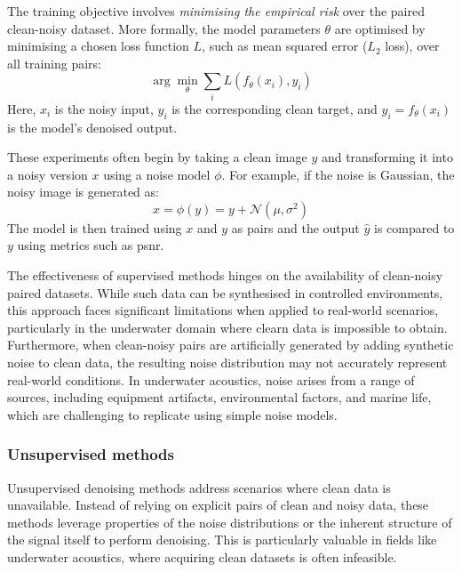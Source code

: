 The training objective involves \textit{minimising the empirical risk} over the paired clean-noisy dataset. More formally, the model parameters $\theta$ are optimised by minimising a chosen loss function $L$, such as mean squared error ($L_2$ loss), over all training pairs:
\begin{equation}
    \arg \min_\theta \sum_i L(f_\theta (x_i), y_i)
\end{equation}
Here, $x_i$ is the noisy input, $y_i$ is the corresponding clean target, and $\hat{y}_i = f_\theta(x_i)$ is the model's denoised output.

These experiments often begin by taking a clean image $y$ and transforming it into a noisy version \( x \) using a noise model \(\phi\). For example, if the noise is Gaussian, the noisy image is generated as:
\begin{equation}
    x = \phi(y) = y + \mathcal{N}(\mu, \sigma^2)
\end{equation}
The model is then trained using $x$ and $y$ as pairs and the output $\hat{y}$ is compared to $y$ using metrics such as \acrshort{psnr}.

The effectiveness of supervised methods hinges on the availability of clean-noisy paired datasets. While such data can be synthesised in controlled environments, this approach faces significant limitations when applied to real-world scenarios, particularly in the underwater domain where clearn data is impossible to obtain. Furthermore, when clean-noisy pairs are artificially generated by adding synthetic noise to clean data, the resulting noise distribution may not accurately represent real-world conditions. In underwater acoustics, noise arises from a range of sources, including equipment artifacts, environmental factors, and marine life, which are challenging to replicate using simple noise models.

\subsubsection{Unsupervised methods}

Unsupervised denoising methods address scenarios where clean data is unavailable. Instead of relying on explicit pairs of clean and noisy data, these methods leverage properties of the noise distributions or the inherent structure of the signal itself to perform denoising. This is particularly valuable in fields like underwater acoustics, where acquiring clean datasets is often infeasible.

